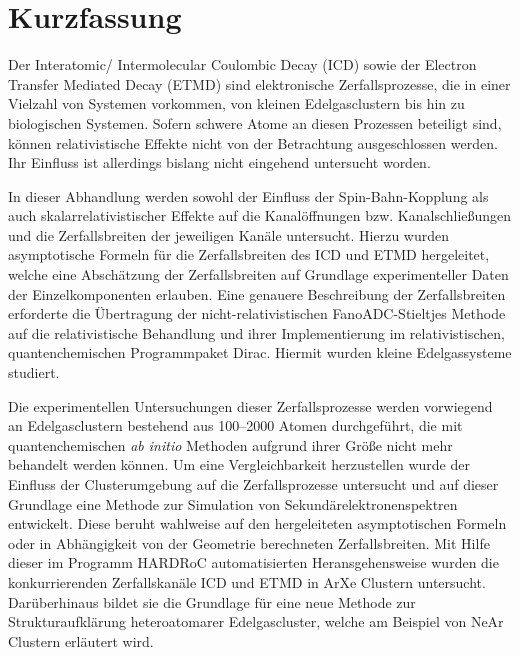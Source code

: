 \chapter*{Kurzfassung}
\thispagestyle{empty}

Der Interatomic/ Intermolecular Coulombic Decay (ICD) sowie der
Electron Transfer Mediated Decay (ETMD) sind elektronische Zerfallsprozesse,
die in einer Vielzahl von Systemen vorkommen, von kleinen
Edelgasclustern bis hin zu biologischen Systemen. Sofern schwere Atome
an diesen Prozessen beteiligt sind, können relativistische Effekte
nicht von der Betrachtung ausgeschlossen werden. Ihr Einfluss ist allerdings
bislang nicht eingehend untersucht worden.

In dieser Abhandlung werden sowohl der Einfluss der Spin-Bahn-Kopplung
als auch skalarrelativistischer Effekte auf die Kanalöffnungen bzw.
Kanalschließungen und die Zerfallsbreiten der jeweiligen Kanäle untersucht.
Hierzu wurden asymptotische Formeln für die Zerfallsbreiten des ICD und ETMD
hergeleitet, welche eine Abschätzung der Zerfallsbreiten auf Grundlage
experimenteller Daten der Einzelkomponenten erlauben.
Eine genauere Beschreibung der Zerfallsbreiten erforderte die Übertragung
der nicht-relativistischen FanoADC-Stieltjes Methode auf die relativistische
Behandlung und ihrer Implementierung im relativistischen, quantenchemischen
Programmpaket Dirac. Hiermit wurden kleine Edelgassysteme studiert.

Die experimentellen Untersuchungen dieser Zerfallsprozesse werden vorwiegend an
Edelgasclustern bestehend aus 100--2000 Atomen durchgeführt, die mit
quantenchemischen \emph{ab initio} Methoden aufgrund ihrer Größe
nicht mehr behandelt werden können.
Um eine Vergleichbarkeit herzustellen wurde der Einfluss der Clusterumgebung
auf die Zerfallsprozesse untersucht und auf dieser Grundlage eine
Methode zur Simulation von Sekundärelektronenspektren entwickelt. Diese
beruht wahlweise auf den hergeleiteten asymptotischen Formeln oder
in Abhängigkeit von der Geometrie berechneten Zerfallsbreiten. Mit Hilfe dieser
im Programm HARDRoC automatisierten Heransgehensweise wurden die konkurrierenden
Zerfallskanäle ICD und ETMD in ArXe Clustern untersucht. Darüberhinaus
bildet sie die Grundlage für eine neue Methode zur Strukturaufklärung
heteroatomarer Edelgascluster, welche am Beispiel von NeAr Clustern
erläutert wird.
